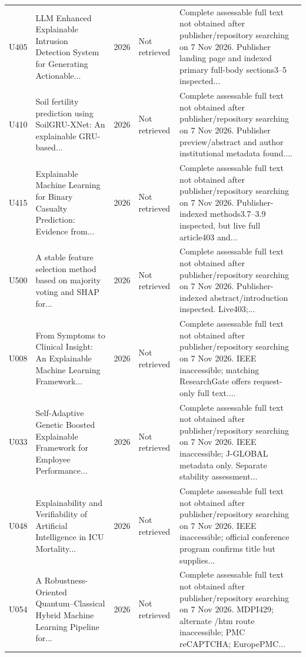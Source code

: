 \begin{longtable}{@{}P{1.0cm}P{6.3cm}P{0.7cm}P{1.6cm}P{6.1cm}@{}}
U405 & LLM Enhanced Explainable Intrusion Detection System for Generating Actionable... & 2026 & Not retrieved & Complete assessable full text not obtained after publisher/\allowbreak{}repository searching on 7 Nov 2026. Publisher landing page and indexed primary full-body sections3--5 inspected... \\
U410 & Soil fertility prediction using SoilGRU-XNet: An explainable GRU-based... & 2026 & Not retrieved & Complete assessable full text not obtained after publisher/\allowbreak{}repository searching on 7 Nov 2026. Publisher preview/\allowbreak{}abstract and author institutional metadata found.... \\
U415 & Explainable Machine Learning for Binary Casualty Prediction: Evidence from... & 2026 & Not retrieved & Complete assessable full text not obtained after publisher/\allowbreak{}repository searching on 7 Nov 2026. Publisher-indexed methods3.7--3.9 inspected, but live full article403 and... \\
U500 & A stable feature selection method based on majority voting and SHAP for... & 2026 & Not retrieved & Complete assessable full text not obtained after publisher/\allowbreak{}repository searching on 7 Nov 2026. Publisher-indexed abstract/\allowbreak{}introduction inspected. Live403;... \\
U008 & From Symptoms to Clinical Insight: An Explainable Machine Learning Framework... & 2026 & Not retrieved & Complete assessable full text not obtained after publisher/\allowbreak{}repository searching on 7 Nov 2026. IEEE inaccessible; matching ResearchGate offers request-only full text.... \\
U033 & Self-Adaptive Genetic Boosted Explainable Framework for Employee Performance... & 2026 & Not retrieved & Complete assessable full text not obtained after publisher/\allowbreak{}repository searching on 7 Nov 2026. IEEE inaccessible; J-GLOBAL metadata only. Separate stability assessment... \\
U048 & Explainability and Verifiability of Artificial Intelligence in ICU Mortality... & 2026 & Not retrieved & Complete assessable full text not obtained after publisher/\allowbreak{}repository searching on 7 Nov 2026. IEEE inaccessible; official conference program confirms title but supplies... \\
U054 & A Robustness-Oriented Quantum--Classical Hybrid Machine Learning Pipeline for... & 2026 & Not retrieved & Complete assessable full text not obtained after publisher/\allowbreak{}repository searching on 7 Nov 2026. MDPI429; alternate /\allowbreak{}htm route inaccessible; PMC reCAPTCHA; EuropePMC... \\

\end{longtable}
